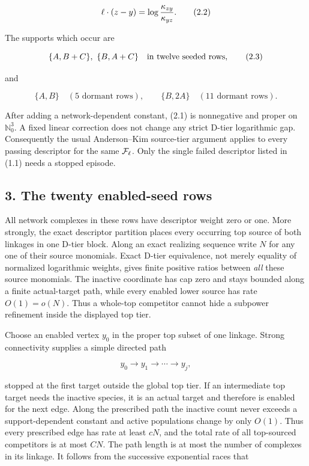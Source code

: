 \[
 \ell\cdot(z-y)=\log{\kappa_{zy}\over\kappa_{yz}}.     \tag{2.2}
\]

The supports which occur are

\[
 \{A,B+C\},\ \{B,A+C\}\quad\hbox{in twelve seeded rows}, \tag{2.3}
\]

and

\[
 \{A,B\}\quad(5\text{ dormant rows}),\qquad
 \{B,2A\}\quad(11\text{ dormant rows}).               \tag{2.4}
\]

After adding a network-dependent constant, (2.1) is nonnegative and
proper on \(\mathbb N_0^3\). A fixed linear correction does not change
any strict D-tier logarithmic gap. Consequently the usual Anderson--Kim
source-tier argument applies to every passing descriptor for the same
\({\cal F}_\ell\). Only the single failed descriptor listed in (1.1)
needs a stopped episode.

\subsection{3. The twenty enabled-seed
rows}

All network complexes in these rows have descriptor weight zero or one.
More strongly, the exact descriptor partition places every occurring top
source of both linkages in one D-tier block. Along an exact realizing
sequence write \(N\) for any one of their source monomials. Exact D-tier
equivalence, not merely equality of normalized logarithmic weights,
gives finite positive ratios between \emph{all} these source monomials.
The inactive coordinate has cap zero and stays bounded along a finite
actual-target path, while every enabled lower source has rate
\(O(1)=o(N)\). Thus a whole-top competitor cannot hide a subpower
refinement inside the displayed top tier.

Choose an enabled vertex \(y_0\) in the proper top subset of one
linkage. Strong connectivity supplies a simple directed path

\[
 y_0\longrightarrow y_1\longrightarrow\cdots
 \longrightarrow y_j,                                 \tag{3.1}
\]

stopped at the first target outside the global top tier. If an
intermediate top target needs the inactive species, it is an actual
target and therefore is enabled for the next edge. Along the prescribed
path the inactive count never exceeds a support-dependent constant and
active populations change by only \(O(1)\). Thus every prescribed edge
has rate at least \(cN\), and the total rate of all top-sourced
competitors is at most \(CN\). The path length is at most the number of
complexes in its linkage. It follows from the successive exponential
races that

